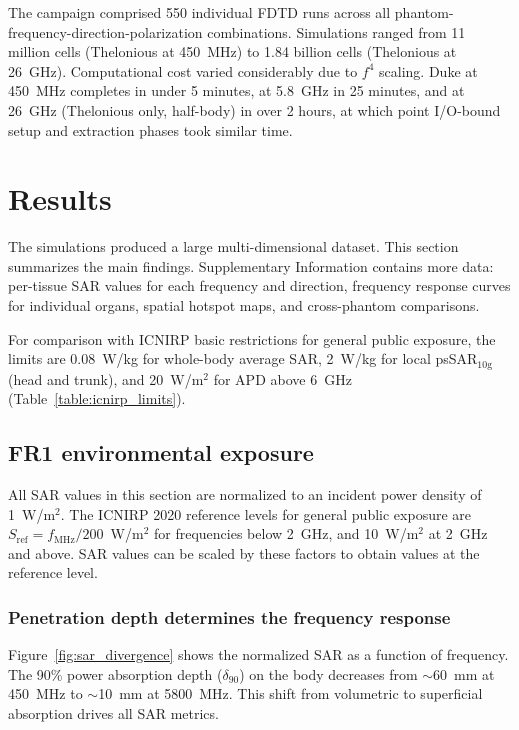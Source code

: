 \documentclass{iopjournal}
\begin{document}
The campaign comprised 550 individual \gls{FDTD} runs across all phantom-frequency-direction-polarization combinations.
Simulations ranged from 11 million cells (Thelonious at 450~MHz) to 1.84 billion cells (Thelonious at 26~GHz).
Computational cost varied considerably due to $f^4$ scaling. Duke at 450~MHz completes in under 5 minutes, at 5.8~GHz in 25 minutes, and at 26~GHz (Thelonious only, half-body) in over 2 hours, at which point I/O-bound setup and extraction phases took similar time.

\section{Results}
\label{sec:results}

The simulations produced a large multi-dimensional dataset.
This section summarizes the main findings.
Supplementary Information contains more data: per-tissue \gls{SAR} values for each frequency and direction, frequency response curves for individual organs, spatial hotspot maps, and cross-phantom comparisons.

For comparison with \gls{ICNIRP} basic restrictions for general public exposure, the limits are 0.08~W/kg for whole-body average \gls{SAR}, 2~W/kg for local psSAR$_{10\mathrm{g}}$ (head and trunk), and 20~W/m$^2$ for APD above 6~GHz (Table~\ref{table:icnirp_limits}).

\subsection{FR1 environmental exposure}
\label{sec:results_fr1_env}

All \gls{SAR} values in this section are normalized to an incident power density of 1~W/m$^2$.
The \gls{ICNIRP} 2020 reference levels for general public exposure are $S_\mathrm{ref} = f_\mathrm{MHz}/200$~W/m$^2$ for frequencies below 2~GHz, and 10~W/m$^2$ at 2~GHz and above.
SAR values can be scaled by these factors to obtain values at the reference level.

\subsubsection{Penetration depth determines the frequency response}

Figure~\ref{fig:sar_divergence} shows the normalized \gls{SAR} as a function of frequency.
The 90\% power absorption depth ($\delta_{90}$) on the body decreases from $\sim$60~mm at 450~MHz to $\sim$10~mm at 5800~MHz.
This shift from volumetric to superficial absorption drives all \gls{SAR} metrics.
\end{document}
